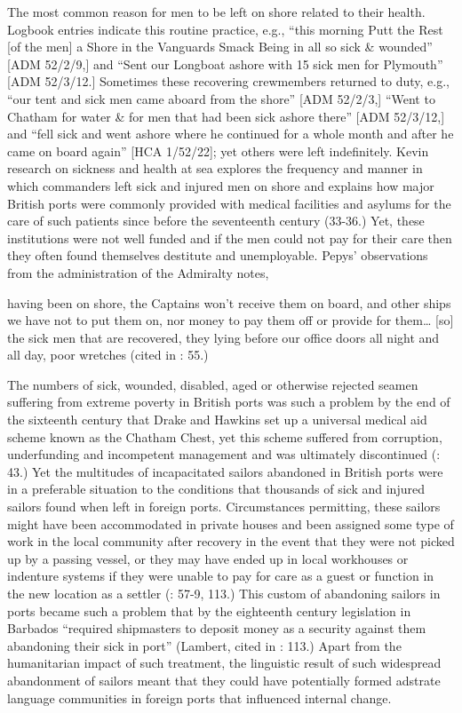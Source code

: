 The most common reason for men to be left on shore related to their health. Logbook entries indicate this routine practice, e.g., “this morning Putt the Rest [of the men] a Shore in the Vanguards Smack Being in all so sick \& wounded” [ADM 52/2/9,] and “Sent our Longboat ashore with 15 sick men for Plymouth” [ADM 52/3/12.] Sometimes these recovering crewmembers returned to duty, e.g., “our tent and sick men came aboard from the shore” [ADM 52/2/3,] “Went to Chatham for water \& for men that had been sick ashore there” [ADM 52/3/12,] and “fell sick and went ashore where he continued for a whole month and after he came on board again” [HCA 1/52/22]; yet others were left indefinitely. Kevin  research on sickness and health at sea explores the frequency and manner in which commanders left sick and injured men on shore and explains how major British ports were commonly provided with medical facilities and asylums for the care of such patients since before the seventeenth century (33-36.) Yet, these institutions were not well funded and if the men could not pay for their care then they often found themselves destitute and unemployable. Pepys’ observations from the administration of the Admiralty notes, 

having been on shore, the Captains won’t receive them on board, and other ships we have not to put them on, nor money to pay them off or provide for them… [so] the sick men that are recovered, they lying before our office doors all night and all day, poor wretches (cited in \citealt{Brown2011}: 55.) 

The numbers of sick, wounded, disabled, aged or otherwise rejected seamen suffering from extreme poverty in British ports was such a problem by the end of the sixteenth century that Drake and Hawkins set up a universal medical aid scheme known as the Chatham Chest, yet this scheme suffered from corruption, underfunding and incompetent management and was ultimately discontinued (\citealt{Brown2011}: 43.) Yet the multitudes of incapacitated sailors abandoned in British ports were in a preferable situation to the conditions that thousands of sick and injured sailors found when left in foreign ports. Circumstances permitting, these sailors might have been accommodated in private houses and been assigned some type of work in the local community after recovery in the event that they were not picked up by a passing vessel, or they may have ended up in local workhouses or indenture systems if they were unable to pay for care as a guest or function in the new location as a settler (\citealt{Brown2011}: 57-9, 113.) This custom of abandoning sailors in ports became such a problem that by the eighteenth century legislation in Barbados “required shipmasters to deposit money as a security against them abandoning their sick in port” (Lambert, cited in \citealt{Brown2011}: 113.) Apart from the humanitarian impact of such treatment, the linguistic result of such widespread abandonment of sailors meant that they could have potentially formed adstrate language communities in foreign ports that influenced internal change.

